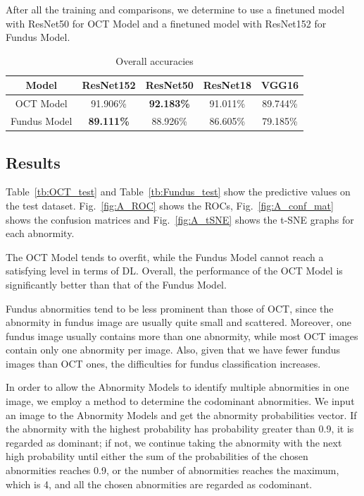 \documentclass{article}
\begin{document}
	\vspace{0.2cm}
	
	After all the training and comparisons, we determine to use a finetuned model with ResNet50 for OCT Model and a finetuned model with ResNet152 for Fundus Model. 
	
	{
		\fontsize{9}{12}\selectfont
		{
			\begin{table}
				\centering
				\caption{Overall accuracies}
				\label{tb:A_accuracies}
				\begin{tabular}{ccccc}
					\toprule
					Model&ResNet152&ResNet50&ResNet18&VGG16\\
					\midrule
					OCT Model   &91.906\%&\textbf{92.183\%}&91.011\%&89.744\% \\
					Fundus Model&\textbf{89.111\%}&88.926\%&86.605\%&79.185\% \\
					\bottomrule
				\end{tabular}
			\end{table}
		}
	}
	
	\subsection{Results}
	
	Table~\ref{tb:OCT_test} and Table~\ref{tb:Fundus_test} show the predictive values on the test dataset. Fig.~\ref{fig:A_ROC} shows the ROCs, Fig.~\ref{fig:A_conf_mat} shows the confusion matrices and Fig.~\ref{fig:A_tSNE} shows the t-SNE graphs for each abnormity.
	
	The OCT Model tends to overfit, while the Fundus Model cannot reach a satisfying level in terms of DL. Overall, the performance of the OCT Model is significantly better than that of the Fundus Model.
	
	Fundus abnormities tend to be less prominent than those of OCT, since the abnormity in fundus image are usually quite small and scattered. Moreover, one fundus image usually contains more than one abnormity, while most OCT images contain only one abnormity per image. Also, given that we have fewer fundus images than OCT ones, the difficulties for fundus classification increases.
	
	In order to allow the Abnormity Models to identify multiple abnormities in one image, we employ a method to determine the codominant abnormities. We input an image to the Abnormity Models and get the abnormity probabilities vector. If the abnormity with the highest probability has probability greater than 0.9, it is regarded as dominant; if not, we continue taking the abnormity with the next high probability until either the sum of the probabilities of the chosen abnormities reaches 0.9, or the number of abnormities reaches the maximum, which is 4, and all the chosen abnormities are regarded as codominant. 
	
\end{document}
